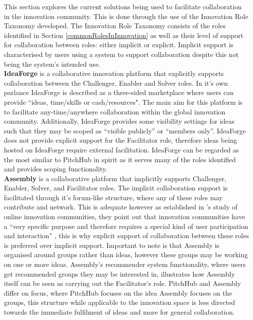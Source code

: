 This section explores the current solutions being used to facilitate collaboration in the innovation community. This is done through the use of the Innovation Role Taxonomy developed. The Innovation Role Taxonomy consists of the roles identified in Section \ref{commonRolesInInnovation} as well as their level of support for collaboration between roles: either implicit or explicit. Implicit support is characterised by users using a system to support collaboration despite this not being the system's intended use.
\\
\newline
\textbf{IdeaForge} \cite{ideaForge:online}
is a collaborative innovation platform that explicitly supports collaboration between the Challenger, Enabler and Solver roles. In it's own parlance IdeaForge is described as a three-sided marketplace where users can provide ``ideas, time/skills or cash/resources". The main aim for this platform is to facilitate any-time/anywhere collaboration within the global innovation community. Additionally, IdeaForge provides some visibility settings for ideas such that they may be scoped as ``visible publicly'' or ``members only''. IdeaForge does not provide explicit support for the Facilitator role, therefore ideas being hosted on IdeaForge require external facilitation. IdeaForge can be regarded as the most similar to PitchHub in spirit as it serves many of the roles identified and provides scoping functionality.
\\
\newline
\textbf{Assembly} \cite{assembly:online}
is a collaborative platform that implicitly supports Challenger, Enabler, Solver, and Facilitator roles. The implicit collaboration support is facilitated through it's forum-like structure, where any of these roles may contribute and network. This is adequate however as established in \citeauthor{hautz2010establish}'s study of online innovation communities, they point out that innovation communities have a ``very specific purpose and therefore requires a special kind of user participation and interaction'' \cite{hautz2010establish}, this is why explicit support of collaboration between these roles is preferred over implicit support. Important to note is that Assembly is organised around groups rather than ideas, however these groups may be working on one or more ideas. Assembly's recommender system functionality, where users get recommended groups they may be interested in, illustrates how Assembly itself can be seen as carrying out the Facilitator's role. PitchHub and Assembly differ on focus, where PitchHub focuses on the idea Assembly focuses on the groups, this structure while applicable to the innovation space is less directed towards the immediate fulfilment of ideas and more for general collaboration.
